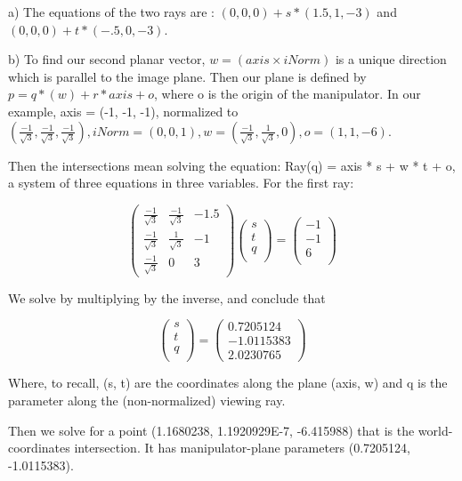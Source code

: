 \documentclass{letter}
\begin{document}
a) The equations of the two rays are : $(0, 0, 0) + s*(1.5, 1, -3)$  and $(0, 0, 0) + t * (-.5, 0, -3) $.

b) To find our second planar vector, $w= (axis \times  iNorm)$ is a unique direction which is parallel to the image plane. Then our plane is defined by $p = q * (w) + r * axis + o$, where o is the origin of the manipulator. In our example, axis = (-1, -1, -1), normalized to $(\frac{-1}{\sqrt{3}}, \frac{-1}{\sqrt{3}}, \frac{-1}{\sqrt{3}}), iNorm = (0, 0, 1), w = (\frac{-1}{\sqrt{3}}, \frac{1}{\sqrt{3}}, 0), o = (1, 1, -6)$. 

Then the intersections mean solving the equation: Ray(q) = axis * s + w * t + o, a system of three equations in three variables. For the first ray: 

$$
\begin{pmatrix}
\frac{-1}{\sqrt{3}} & \frac{-1}{\sqrt{3}} & -1.5 \\
\frac{-1}{\sqrt{3}} & \frac{1}{\sqrt{3}} & -1 \\
\frac{-1}{\sqrt{3}} & 0 & 3
\end{pmatrix}
\begin{pmatrix}
s \\
t \\
q \\
\end{pmatrix}
=
\begin{pmatrix}
-1 \\
-1 \\
6 \\
\end{pmatrix}
$$

We solve by multiplying by the inverse, and conclude that 

$$
\begin{pmatrix}
s \\
t \\
q\\
\end{pmatrix}
=
\begin{pmatrix}
0.7205124 \\ -1.0115383 \\ 2.0230765
\end{pmatrix}
$$

Where, to recall, (s, t) are the coordinates along the plane (axis, w) and q is the parameter along the (non-normalized) viewing ray. 

Then we solve for a point ({1.1680238, 1.1920929E-7, -6.415988}) that is the world-coordinates intersection. It has manipulator-plane parameters (0.7205124, -1.0115383). 
\end{document}
